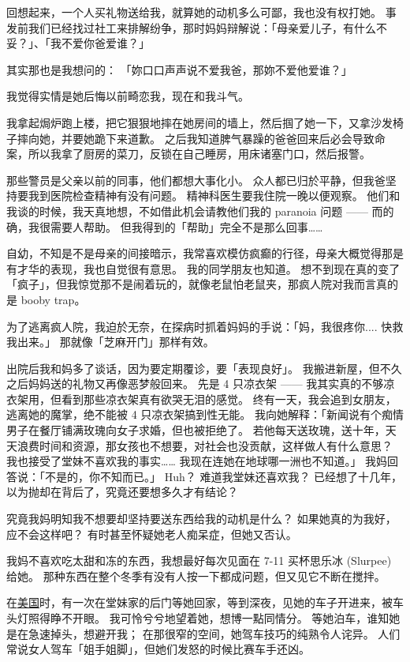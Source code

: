 \documentclass[12pt]{report}
\begin{document}
回想起来，一个人买礼物送给我，就算她的动机多么可鄙，我也没有权打她。 事发前我们已经找过社工来排解纷争，那时妈妈辩解说：「母亲爱儿子，有什么不妥？」、「我不爱你爸爱谁？」

其实那也是我想问的： 「妳口口声声说不爱我爸，那妳不爱他爱谁？」

我觉得实情是她后悔以前畸恋我，现在和我斗气。

我拿起焗炉跑上楼，把它狠狠地摔在她房间的墙上，然后掴了她一下，又拿沙发椅子摔向她，并要她跪下来道歉。 之后我知道脾气暴躁的爸爸回来后必会导致命案，所以我拿了厨房的菜刀，反锁在自己睡房，用床诸塞门口，然后报警。

那些警员是父亲以前的同事，他们都想大事化小。 众人都已归於平静，但我爸坚持要我到医院检查精神有没有问题。 精神科医生要我住院一晚以便观察。 他们和我谈的时候，我天真地想，不如借此机会请教他们我的 paranoia 问题 —— 而的确，我很需要人帮助。 但我得到的「帮助」完全不是那么回事……

自幼，不知是不是母亲的间接暗示，我常喜欢模仿疯癫的行径，母亲大概觉得那是有才华的表现，我也自觉很有意思。 我的同学朋友也知道。 想不到现在真的变了「疯子」，但我惊觉那不是闹着玩的，就像老鼠怕老鼠夹，那疯人院对我而言真的是 booby trap。

为了逃离疯人院，我迫於无奈，在探病时抓着妈妈的手说：「妈，我很疼你.... 快救我出来。」 那就像「芝麻开门」那样有效。

出院后我和妈多了谈话，因为要定期覆诊，要「表现良好」。 我搬进新屋，但不久之后妈妈送的礼物又再像恶梦般回来。 先是 4 只凉衣架 —— 我其实真的不够凉衣架用，但看到那些凉衣架真有欲哭无泪的感觉。 终有一天，我会追到女朋友，逃离她的魔掌，绝不能被 4 只凉衣架搞到性无能。 我向她解释：「新闻说有个痴情男子在餐厅铺满玫瑰向女子求婚，但也被拒绝了。 若他每天送玫瑰，送十年，天天浪费时间和资源，那女孩也不想要，对社会也没贡献，这样做人有什么意思？ 我也接受了堂妹不喜欢我的事实…… 我现在连她在地球哪一洲也不知道。」 我妈回答说：「不是的，你不知而已。」 Huh？ 难道我堂妹还喜欢我？ 已经想了十几年，以为抛却在背后了，究竟还要想多久才有结论？

究竟我妈明知我不想要却坚持要送东西给我的动机是什么？ 如果她真的为我好，应不会这样吧？ 有时甚至怀疑她老人痴呆症，但她又否认。

我妈不喜欢吃太甜和冻的东西，我想最好每次见面在 7-11 买杯思乐冰 (Slurpee) 给她。 那种东西在整个冬季有没有人按一下都成问题，但又见它不断在搅拌。

在\uline{美国}时，有一次在堂妹家的后门等她回家，等到深夜，见她的车子开进来，被车头灯照得睁不开眼。 我可怜兮兮地望着她，想博一點同情分。 等她泊车，谁知她是在急速掉头，想避开我； 在那很窄的空间，她驾车技巧的纯熟令人诧异。 人们常说女人驾车「姐手姐脚」，但她们发怒的时候比赛车手还凶。
\end{document}
